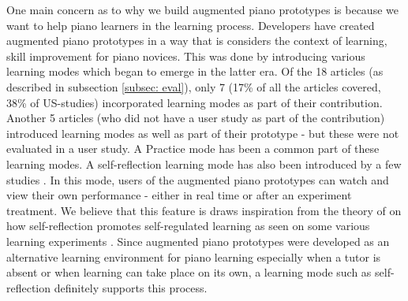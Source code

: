 \documentclass[sigchi, review]{acmart}
\begin{document}

One main concern as to why we build augmented piano prototypes is because we want to help piano learners in the learning process. Developers have created augmented piano prototypes in a way that is considers the context of learning, skill improvement for piano novices. This was done by introducing various learning modes which began to emerge in the latter era. Of the 18 articles (as described in subsection \ref{subsec: eval}), only 7 (17\% of all the articles covered, 38\% of US-studies) incorporated learning modes as part of their contribution. Another 5 articles (who did not have a user study as part of the contribution) introduced learning modes as well as part of their prototype - but these were not evaluated in a user study. A Practice mode has been a common part of these learning modes. A self-reflection learning mode has also been introduced by a few studies \cite{gerry2019adept, xu20195, xiao2013mirrorfugue}. In this mode, users of the augmented piano prototypes can watch and view their own performance - either in real time or after an experiment treatment. We believe that this feature is draws inspiration from the theory of \citet{zimmerman2009self} on how self-reflection promotes self-regulated learning as seen on some various learning experiments \cite{deja2016discovering,lyons2011monitoring}. Since augmented piano prototypes were developed as an alternative learning environment for piano learning especially when a tutor is absent or when learning can take place on its own, a learning mode such as self-reflection definitely supports this process. 
\end{document}
